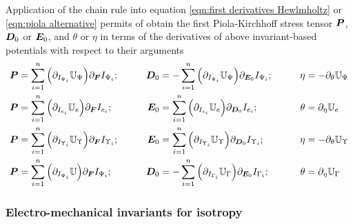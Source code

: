 Application of the chain rule into equation \eqref{eqn:first derivatives Hewlmholtz} or \eqref{eqn:piola alternative} permits of obtain the first Piola-Kirchhoff stress tensor $\boldsymbol{P}$, $\boldsymbol{D}_0$ or $\boldsymbol{E}_0$, and $\theta$ or $\eta$ in terms of the derivatives of above invariant-based potentials with respect to their arguments
%
\begin{equation}\label{eqn:Piola invariants isotropy}
\begin{aligned}	
\vect{P}&=\sum_{i=1}^n\Big(\partial_{I_{\Psi_i}}\mathbb{U}_{\Psi}\Big) \partial_{\vect{F}}I_{\Psi_i};&\qquad
%
\vect{D}_0&=-\sum_{i=1}^n\Big(\partial_{I_{\Psi_i}}\mathbb{U}_{\Psi}\Big) \partial_{\vect{E}_0}I_{\Psi_i};&\qquad
%
\eta  & =  -\partial_\theta \mathbb{U}_{\Psi}\\
%
%
\vect{P}&=\sum_{i=1}^n\Big(\partial_{I_{e_i}}\mathbb{U}_e\Big) \partial_{\vect{F}}I_{e_i};&\qquad
%
\vect{E}_0&=\sum_{i=1}^n\Big(\partial_{I_{e_i}}\mathbb{U}_e\Big) \partial_{\vect{D}_0}I_{e_i};&\qquad
%
\theta &  =  \partial_\eta \mathbb{U}_e\\
%
%
\vect{P}&=\sum_{i=1}^n\Big(\partial_{I_{\Upsilon_i}}\mathbb{U}_{\Upsilon}\Big) \partial_{\vect{F}}I_{\Upsilon_i};&\qquad
%
\vect{E}_0&=\sum_{i=1}^n\Big(\partial_{I_{\Upsilon_i}}\mathbb{U}_{\Upsilon}\Big) \partial_{\vect{D}_0}I_{\Upsilon_i};&\qquad
%
\eta &  =  -\partial_\theta \mathbb{U}_{\Upsilon}\\
%
%
\vect{P}&=\sum_{i=1}^n\Big(\partial_{I_{\Psi_i}}\mathbb{U}\Big) \partial_{\vect{F}}I_{\Psi_i};&\qquad
%
\vect{D}_0&=-\sum_{i=1}^n\Big(\partial_{I_{{\Gamma}_i}}\mathbb{U}_{\Gamma}\Big) \partial_{\vect{E}_0}I_{{\Gamma}_i};&\qquad
%
\theta  & =  \partial_\eta \mathbb{U}_{\Gamma}
%
\end{aligned}
\end{equation}

%



\subsubsection{Electro-mechanical invariants for isotropy}

